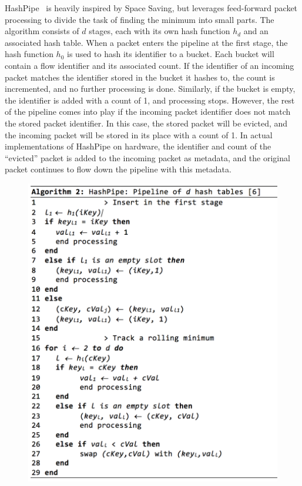HashPipe~\cite{hashpipe} is heavily inspired by Space Saving, but leverages feed-forward packet processing to divide the task of finding the minimum into small parts. The algorithm consists of $d$ stages, each with its own hash function $h_d$ and an associated hash table. When a packet enters the pipeline at the first stage, the hash function $h_0$ is used to hash its identifier to a bucket. Each bucket will contain a flow identifier and its associated count. If the identifier of an incoming packet matches the identifier stored in the bucket it hashes to, the count is incremented, and no further processing is done. Similarly, if the bucket is empty, the identifier is added with a count of 1, and processing stops. However, the rest of the pipeline comes into play if the incoming packet identifier does not match the stored packet identifier. In this case, the stored packet will be evicted, and the incoming packet will be stored in its place with a count of 1. In actual implementations of HashPipe on hardware, the identifier and count of the ``evicted'' packet is added to the incoming packet as metadata, and the original packet continues to flow down the pipeline with this metadata.
\begin{figure}[t]
  \centering
    \includegraphics[scale=0.42]{alg2}
     \label{fig:bp-image}
\end{figure}
